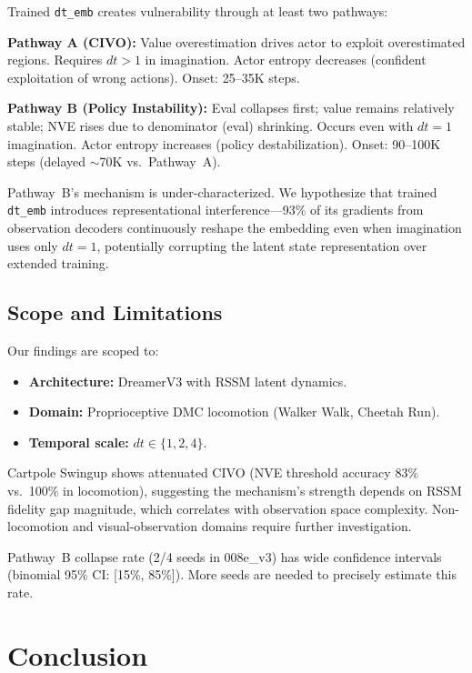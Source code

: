 \documentclass[letterpaper]{article}
\begin{document}
Trained \texttt{dt\_emb} creates vulnerability through at least two pathways:

\textbf{Pathway A (CIVO):} Value overestimation drives actor to exploit overestimated regions.
Requires $dt>1$ in imagination.
Actor entropy decreases (confident exploitation of wrong actions).
Onset: 25--35K steps.

\textbf{Pathway B (Policy Instability):} Eval collapses first; value remains relatively stable; NVE rises due to denominator (eval) shrinking.
Occurs even with $dt{=}1$ imagination.
Actor entropy increases (policy destabilization).
Onset: 90--100K steps (delayed $\sim$70K vs.\ Pathway~A).

Pathway~B's mechanism is under-characterized.
We hypothesize that trained \texttt{dt\_emb} introduces representational interference---93\% of its gradients from observation decoders continuously reshape the embedding even when imagination uses only $dt{=}1$, potentially corrupting the latent state representation over extended training.

\subsection{Scope and Limitations}

Our findings are scoped to:
\begin{itemize}[nosep]
    \item \textbf{Architecture:} DreamerV3 with RSSM latent dynamics.
    \item \textbf{Domain:} Proprioceptive DMC locomotion (Walker Walk, Cheetah Run).
    \item \textbf{Temporal scale:} $dt \in \{1, 2, 4\}$.
\end{itemize}

Cartpole Swingup shows attenuated CIVO (NVE threshold accuracy 83\% vs.\ 100\% in locomotion), suggesting the mechanism's strength depends on RSSM fidelity gap magnitude, which correlates with observation space complexity.
Non-locomotion and visual-observation domains require further investigation.

Pathway~B collapse rate (2/4 seeds in 008e\_v3) has wide confidence intervals (binomial 95\% CI: [15\%, 85\%]).
More seeds are needed to precisely estimate this rate.

\section{Conclusion}
\end{document}
